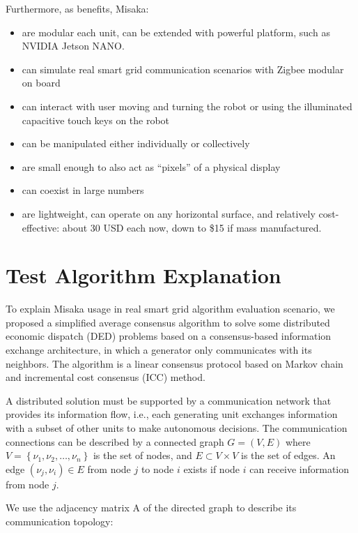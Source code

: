 \documentclass[conference]{IEEEtran}
\begin{document}
Furthermore, as benefits, Misaka:

\begin{itemize}
    \item are modular each unit, can be extended with powerful platform, such as NVIDIA Jetson NANO.
    \item can simulate real smart grid communication scenarios with Zigbee modular on board
    \item can interact with user moving and turning the robot or using the illuminated capacitive touch keys on the robot 
    \item can be manipulated either individually or collectively
    \item are small enough to also act as “pixels” of a physical display
    \item can coexist in large numbers
    \item are lightweight, can operate on any horizontal surface, and relatively cost-effective: about 30 USD each now, down to \$15 if mass manufactured.
\end{itemize}

\section{Test Algorithm Explanation}

To explain Misaka usage in real smart grid algorithm evaluation scenario, we proposed a simplified average consensus algorithm to solve some distributed economic dispatch (DED) problems based on a consensus-based information exchange architecture, in which a generator only communicates with its neighbors. The algorithm is a linear consensus protocol based on Markov chain and incremental cost consensus (ICC) method.

A distributed solution must be supported by a communication network that provides its information flow, i.e., each generating unit exchanges information with a subset of other units to make autonomous decisions\cite{binetti2013distributed}. The communication connections can be described by a connected graph $G=(V, E)$ where $V=\left\{\nu_{1}, \nu_{2}, \ldots, \nu_{n}\right\}$ is the set of nodes, and $E \subset V \times V$
is the set of edges. An edge $\left(\nu_{j}, \nu_{i}\right) \in E$ from node $j$ to node $i$ exists if node $i$ can receive information from node $j$.

We use the adjacency matrix A of the directed graph to describe its communication topology:
\end{document}

